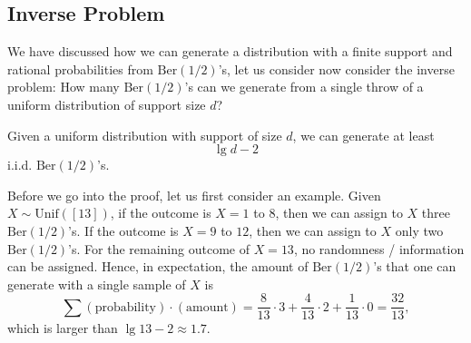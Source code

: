 \subsection{Inverse Problem}

We have discussed how we can generate a distribution with a finite support and rational probabilities from $\mathrm{Ber}(1/2)$'s, let us consider now consider the inverse problem: How many $\mathrm{Ber}(1/2)$'s can we generate from a single throw of a uniform distribution of support size $d$?

\begin{theorem}
    Given a uniform distribution with support of size $d$, we can generate at least
    \begin{equation}
        \lg d - 2
    \end{equation}
    i.i.d. $\mathrm{Ber}(1/2)$'s.
\end{theorem}
\begin{example}
    Before we go into the proof, let us first consider an example. Given $X\sim\mathrm{Unif}([13])$, if the outcome is $X=1$ to $8$, then we can assign to $X$ three $\mathrm{Ber}(1/2)$'s. If the outcome is $X=9$ to $12$, then we can assign to $X$ only two $\mathrm{Ber}(1/2)$'s. For the remaining outcome of $X=13$, no randomness / information can be assigned. Hence, in expectation, the amount of $\mathrm{Ber}(1/2)$'s that one can generate with a single sample of $X$ is
    \begin{equation*}
        \sum (\text{probability}) \cdot (\text{amount}) = \frac{8}{13} \cdot 3 + \frac{4}{13} \cdot 2 + \frac{1}{13} \cdot 0 = \frac{32}{13},
    \end{equation*}
    which is larger than $\lg13-2 \approx 1.7$.
\end{example}
